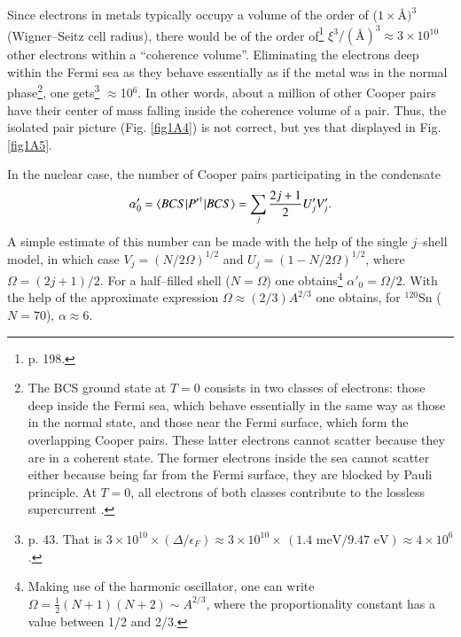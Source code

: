 \begin{subappendices}
Since electrons in metals typically occupy a volume of the order of ($1\times$\AA$)^3$ (Wigner--Seitz cell radius), there would be of the order of\footnote{\cite{Ketterson:99} p. 198.} $\xi^3/(\text{\AA})^3\approx 3\times10^{10}$ other electrons within a ``coherence volume''. Eliminating the electrons deep within the Fermi sea as they behave essentially as if the metal was in the normal phase\footnote{The BCS ground state at $T=0$ consists in two classes of electrons: those deep inside the Fermi sea, which behave essentially in the same way as those in the normal state, and those near the Fermi surface, which form the overlapping Cooper pairs. These latter electrons cannot scatter because they are in a coherent state. The former electrons inside the sea cannot scatter either because being far from the Fermi surface, they are blocked by Pauli principle. At $T=0$, all electrons of both classes contribute to the lossless supercurrent \cite{Waldram:96}.}, one gets\footnote{\cite{Schrieffer:64} p. 43.  That is $3\times10^{10}\times(\Delta/\epsilon_F)\approx3\times10^{10}\times\,(1.4\text{ meV}/9.47\text{ eV})\approx 4\times 10^{6}$.} $\approx$10$^6$. In other words, about a million of other Cooper pairs have their center of mass falling inside the coherence volume of a pair. Thus, the isolated pair picture (Fig. \ref{fig1A4}) is not correct, but yes that displayed in Fig. \ref{fig1A5}.





 


 In the nuclear case, the number of Cooper pairs participating in the condensate 
 \begin{align}\label{eq3B11}
\alpha'_0=\langle {BCS|P'^\dagger|BCS} \rangle=\sum_j\frac{2j+1}{2}U'_jV'_j.
 \end{align}
 A simple estimate of this number can be made with the help of the single $j$--shell model, in which case $V_j=(N/2\Omega)^{1/2}$ and $U_j=(1-N/2\Omega)^{1/2}$, where $\Omega=(2j+1)/2$. For a half--filled shell ($N=\Omega$) one obtains\footnote{Making use of the harmonic oscillator, one can write $\Omega=\frac{1}{2}(N+1)(N+2)\sim A^{2/3}$, where the proportionality constant has a value between 1/2 and 2/3.} $\alpha'_0=\Omega/2$. With the help of the approximate expression $\Omega\approx(2/3)A^{2/3}$ one obtains, for $^{120}$Sn ($N=70$), $\alpha\approx6$.
 

\end{subappendices}
